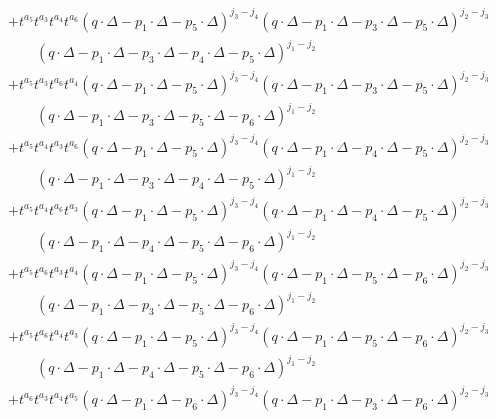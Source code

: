 \documentclass[12pt]{article}
\begin{document}
\begin{eqnarray}
    \\
    &&
+ t^{a_5} t^{a_3} t^{a_4} t^{a_6} 
    (q\cdot \Delta-p_1\cdot \Delta-p_5\cdot \Delta)^{j_3-j_4} (q\cdot \Delta-p_1\cdot \Delta-p_3\cdot \Delta-p_5\cdot \Delta)^{j_2-j_3} 
    \nonumber
    \\
    &&\qquad (q\cdot \Delta-p_1\cdot \Delta-p_3\cdot \Delta-p_4\cdot \Delta-p_5\cdot \Delta)^{j_1-j_2}
    \nonumber
    \\
    &&
+ t^{a_5} t^{a_3} t^{a_6} t^{a_4} 
    (q\cdot \Delta-p_1\cdot \Delta-p_5\cdot \Delta)^{j_3-j_4} (q\cdot \Delta-p_1\cdot \Delta-p_3\cdot \Delta-p_5\cdot \Delta)^{j_2-j_3} 
    \nonumber
    \\
    &&\qquad (q\cdot \Delta-p_1\cdot \Delta-p_3\cdot \Delta-p_5\cdot \Delta-p_6\cdot \Delta)^{j_1-j_2}
    \nonumber
    \\
    &&
+ t^{a_5} t^{a_4} t^{a_3} t^{a_6} 
    (q\cdot \Delta-p_1\cdot \Delta-p_5\cdot \Delta)^{j_3-j_4} (q\cdot \Delta-p_1\cdot \Delta-p_4\cdot \Delta-p_5\cdot \Delta)^{j_2-j_3} 
    \nonumber
    \\
    &&\qquad (q\cdot \Delta-p_1\cdot \Delta-p_3\cdot \Delta-p_4\cdot \Delta-p_5\cdot \Delta)^{j_1-j_2}
    \nonumber
    \\
    &&
+ t^{a_5} t^{a_4} t^{a_6} t^{a_3} 
    (q\cdot \Delta-p_1\cdot \Delta-p_5\cdot \Delta)^{j_3-j_4} (q\cdot \Delta-p_1\cdot \Delta-p_4\cdot \Delta-p_5\cdot \Delta)^{j_2-j_3} 
    \nonumber
    \\
    &&\qquad (q\cdot \Delta-p_1\cdot \Delta-p_4\cdot \Delta-p_5\cdot \Delta-p_6\cdot \Delta)^{j_1-j_2}
    \nonumber
    \\
    &&
+ t^{a_5} t^{a_6} t^{a_3} t^{a_4} 
    (q\cdot \Delta-p_1\cdot \Delta-p_5\cdot \Delta)^{j_3-j_4} (q\cdot \Delta-p_1\cdot \Delta-p_5\cdot \Delta-p_6\cdot \Delta)^{j_2-j_3} 
    \nonumber
    \\
    &&\qquad (q\cdot \Delta-p_1\cdot \Delta-p_3\cdot \Delta-p_5\cdot \Delta-p_6\cdot \Delta)^{j_1-j_2}
    \nonumber
    \\
    &&
+ t^{a_5} t^{a_6} t^{a_4} t^{a_3} 
    (q\cdot \Delta-p_1\cdot \Delta-p_5\cdot \Delta)^{j_3-j_4} (q\cdot \Delta-p_1\cdot \Delta-p_5\cdot \Delta-p_6\cdot \Delta)^{j_2-j_3} 
    \nonumber
    \\
    &&\qquad (q\cdot \Delta-p_1\cdot \Delta-p_4\cdot \Delta-p_5\cdot \Delta-p_6\cdot \Delta)^{j_1-j_2}
    \nonumber
    \\
    &&
+ t^{a_6} t^{a_3} t^{a_4} t^{a_5} 
    (q\cdot \Delta-p_1\cdot \Delta-p_6\cdot \Delta)^{j_3-j_4} (q\cdot \Delta-p_1\cdot \Delta-p_3\cdot \Delta-p_6\cdot \Delta)^{j_2-j_3} 

\end{eqnarray}
\end{document}
